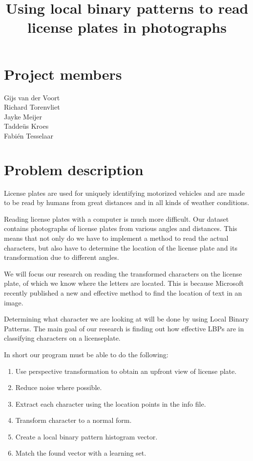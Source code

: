 \documentclass[a4paper]{article}
\title{Using local binary patterns to read license plates in photographs}
\begin{document}
\maketitle

\section*{Project members}
Gijs van der Voort\\
Richard Torenvliet\\
Jayke Meijer\\
Tadde\"us Kroes\\
Fabi\'en Tesselaar

\tableofcontents
\setcounter{secnumdepth}{1}

\section{Problem description}

License plates are used for uniquely identifying motorized vehicles and are
made to be read by humans from great distances and in all kinds of weather
conditions.

Reading license plates with a computer is much more difficult. Our dataset
contains photographs of license plates from various angles and distances. This
means that not only do we have to implement a method to read the actual
characters, but also have to determine the location of the license plate and
its transformation due to different angles.

We will focus our research on reading the transformed characters on the
license plate, of which we know where the letters are located. This is because
Microsoft recently published a new and effective method to find the location of
text in an image.

Determining what character we are looking at will be done by using Local Binary
Patterns. The main goal of our research is finding out how effective LBPs are in
classifying characters on a licenseplate.

In short our program must be able to do the following:

\begin{enumerate}
    \item Use perspective transformation to obtain an upfront view of license
          plate.
    \item Reduce noise where possible.
    \item Extract each character using the location points in the info file.
    \item Transform character to a normal form.
    \item Create a local binary pattern histogram vector.
    \item Match the found vector with a learning set.
\end{enumerate}
\end{document}
